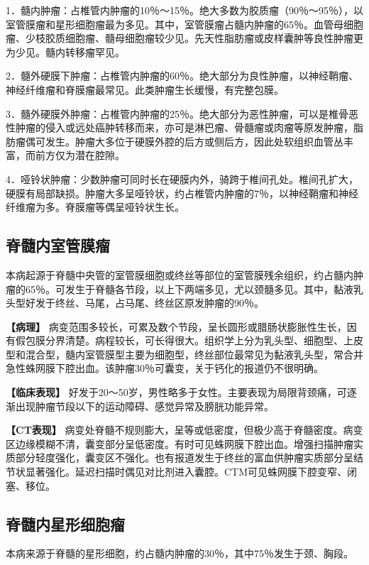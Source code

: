 1．髓内肿瘤：占椎管内肿瘤的10％～15％。绝大多数为胶质瘤（90％～95％），以室管膜瘤和星形细胞瘤最为多见。其中，室管膜瘤占髓内肿瘤的65％。血管母细胞瘤、少枝胶质细胞瘤、髓母细胞瘤较少见。先天性脂肪瘤或皮样囊肿等良性肿瘤更为少见。髓内转移瘤罕见。

2．髓外硬膜下肿瘤：占椎管内肿瘤的60％。绝大部分为良性肿瘤，以神经鞘瘤、神经纤维瘤和脊膜瘤最常见。此类肿瘤生长缓慢，有完整包膜。

3．髓外硬膜外肿瘤：占椎管内肿瘤的25％。绝大部分为恶性肿瘤，可以是椎骨恶性肿瘤的侵入或远处癌肿转移而来，亦可是淋巴瘤、骨髓瘤或肉瘤等原发肿瘤，脂肪瘤偶可发生。肿瘤大多位于硬膜外腔的后方或侧后方，因此处软组织血管丛丰富，而前方仅为潜在腔隙。

4．哑铃状肿瘤：少数肿瘤可同时长在硬膜内外，骑跨于椎间孔处。椎间孔扩大，硬膜有局部缺损。肿瘤大多呈哑铃状，约占椎管内肿瘤的7％，以神经鞘瘤和神经纤维瘤为多。脊膜瘤等偶呈哑铃状生长。

\subsection{脊髓内室管膜瘤}

本病起源于脊髓中央管的室管膜细胞或终丝等部位的室管膜残余组织，约占髓内肿瘤的65％。可发生于脊髓各节段，以上下两端多见，尤以颈髓多见。其中，黏液乳头型好发于终丝、马尾，占马尾、终丝区原发肿瘤的90％。

\textbf{【病理】}
病变范围多较长，可累及数个节段，呈长圆形或腊肠状膨胀性生长，因有假包膜分界清楚。病程较长，可长得很大。组织学上分为乳头型、细胞型、上皮型和混合型，髓内室管膜型主要为细胞型，终丝部位最常见为黏液乳头型，常合并急性蛛网膜下腔出血。该肿瘤30％可囊变，关于钙化的报道仍不很明确。

\textbf{【临床表现】}
好发于20～50岁，男性略多于女性。主要表现为局限背颈痛，可逐渐出现肿瘤节段以下的运动障碍、感觉异常及膀胱功能异常。

\textbf{【CT表现】}
病变处脊髓不规则膨大，呈等或低密度，但极少高于脊髓密度。病变区边缘模糊不清，囊变部分呈低密度。有时可见蛛网膜下腔出血。增强扫描肿瘤实质部分轻度强化，囊变区不强化。也有报道发生于终丝的富血供肿瘤实质部分呈结节状显著强化。延迟扫描时偶见对比剂进入囊腔。CTM可见蛛网膜下腔变窄、闭塞、移位。

\subsection{脊髓内星形细胞瘤}

本病来源于脊髓的星形细胞，约占髓内肿瘤的30％，其中75％发生于颈、胸段。

